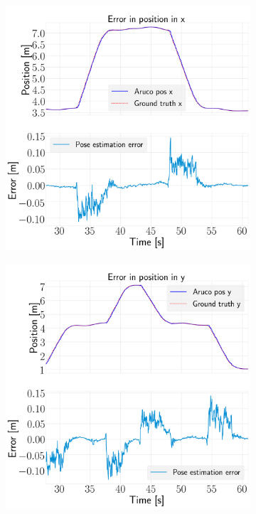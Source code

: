 \documentclass[../Head/report.tex]{subfiles}
\begin{document}
\begin{figure}[H]
    \centering
    \begin{subfigure}[t]{.30\textwidth}
        \centering
        \includegraphics[width=\textwidth]{../Figures/vision_navigation/pose_error_x_test2.png}
        \caption{}
        \label{fig:vision_navigation_error_x}
    \end{subfigure}
     \hspace{0.2em}
    \begin{subfigure}[t]{.30\textwidth}
        \centering
        \includegraphics[width=\textwidth]{../Figures/vision_navigation/pose_error_y_test2.png}

\end{subfigure}
\end{figure}
\end{document}
